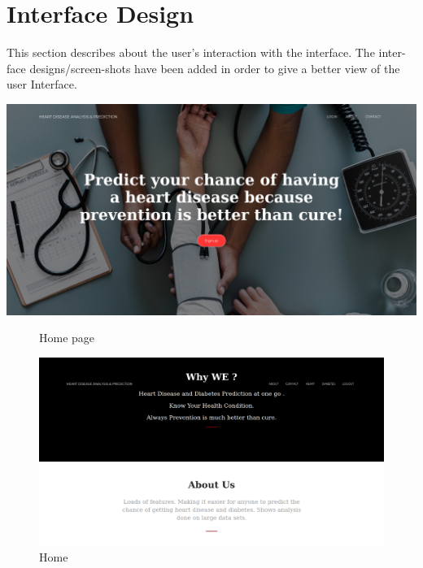 \documentclass[oneside,12pt]{Classes/VTU}
\begin{document}
    	\section{Interface Design}
    	This section describes about the user’s interaction with the interface. The inter-face designs/screen-shots have been added in order to give a better view of the user Interface.
    	
    	
    		\begin{center}
    			\includegraphics[width=17cm]{Screenshots/home1.jpg}
    			\begin{figure}
    				\caption{Home page }
    			\end{figure}
    		\end{center}
    		
    		\begin{figure}
    				\begin{center}
    				\includegraphics[width=17cm]{Screenshots/home2.PNG}
    				\caption{Home}
    				\end{center}
    		\end{figure}
    		
\end{document}
